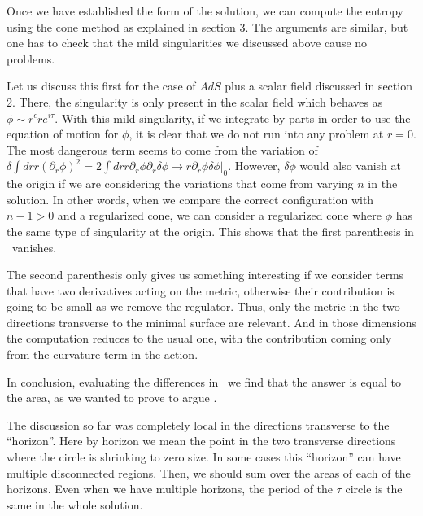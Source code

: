 
Once we have established the form of the solution, we can compute the entropy
using the cone method as explained in section 3.
The arguments are similar, but one has to check that the mild singularities we discussed above cause no problems.

Let us discuss this first for the case of $AdS$ plus a scalar field discussed in section 2.
There, the singularity is only present in the scalar field which behaves as $\phi \sim r^{ \epsilon}  r e^{ i \tau} $.
With this mild singularity, if we integrate by parts in order to use the equation of motion for $\phi$, it is clear
that we do not run into any problem at $r=0$. The most dangerous term seems to come from the variation of
$\delta  \int dr r ( \partial_r \phi )^2  = 2 \int dr r \partial_r \phi  \partial_r \delta \phi \to r \partial_r \phi
 \delta \phi |_0 $. However, $\delta \phi$ would also vanish at the origin if we are considering the variations
  that come from varying $n$ in the solution. In other words, when we compare the correct configuration with $n-1>0$ and
  a regularized cone, we can
  consider a regularized cone where $\phi$ has the same type of singularity at the origin.
  This shows that the first parenthesis in \etnr\ vanishes.

  The second parenthesis only gives us something interesting if we consider terms that have two derivatives acting on the
  metric, otherwise their contribution is going to be small as we remove the regulator. Thus, only the metric in the two
  directions transverse to the minimal surface are relevant. And in those dimensions the computation reduces to the usual
  one, with the contribution coming only from the curvature term in the action.

In conclusion, evaluating the differences in \etnr\ we find that the answer is equal to the area, as we wanted to
prove to argue \RTconj .

The discussion so far was completely local in the directions transverse to the ``horizon''. Here by horizon we
mean the point in the two transverse directions where the circle is shrinking to zero size.
In some cases this ``horizon''  can have  multiple disconnected regions. Then,
 we should sum over the areas of each of the horizons. Even when we have multiple horizons,
the period of the $\tau$ circle is the same in the whole solution.




